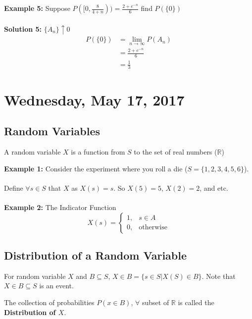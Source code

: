 \documentclass[12pt]{article}
\begin{document}
\textbf{Example 5:} Suppose $P([0,\frac{8}{4+n})) = \frac{2 + e^{-n}}{6}$ find $P(\{ 0 \})$\\\\
\textbf{Solution 5:} $\{A_n\}\uparrow 0$\\
\begin{align*}
	P(\{ 0 \}) &= \lim_{n\to\infty} P(A_n)\\
	&= \frac{2 + e^{-n}}{6}\\
	&= \frac{1}{3}
\end{align*}

\section{Wednesday, May 17, 2017}

\subsection{Random Variables}

\begin{tcolorbox}[title=Definition: Random Variables]
	A random variable $X$ is a function from $S$ to the set of real numbers ($\mathbb{R}$)
\end{tcolorbox}

\textbf{Example 1:} Consider the experiment where you roll a die ($S = \{ 1,2,3,4,5,6 \}$).\\
\\
Define $\forall s\in S$ that $X$ as $X(s) = s$. So $X(5) = 5$, $X(2) = 2$, and etc.
\\
\\
\textbf{Example 2:} The Indicator Function\\
$$X(s) =
\begin{cases}
	1, & s \in A\\
	0, & \text{otherwise}
\end{cases}
$$

\subsection{Distribution of a Random Variable}

\begin{tcolorbox}
	For random variable $X$ and $B \subseteq S$, $X \in B = \{ s \in S | X(S) \in B \}$. Note that $X \in B \subseteq S$ is an event.
\end{tcolorbox}

\begin{tcolorbox}[title=Definition: The Distribution of a Random Variable $X$]
	The collection of probabilities $P(x \in B)$, $\forall$ subset of $\mathbb{R}$ is called the \textbf{Distribution of $X$}.
\end{tcolorbox}
\end{document}
